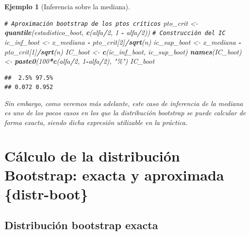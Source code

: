 \documentclass[
]{book}
\newenvironment{Shaded}{\begin{snugshade}}{\end{snugshade}}
\newcommand{\CommentTok}[1]{\textcolor[rgb]{0.56,0.35,0.01}{\textit{#1}}}
\newcommand{\DecValTok}[1]{\textcolor[rgb]{0.00,0.00,0.81}{#1}}
\newcommand{\FunctionTok}[1]{\textcolor[rgb]{0.13,0.29,0.53}{\textbf{#1}}}
\newcommand{\NormalTok}[1]{#1}
\newcommand{\OtherTok}[1]{\textcolor[rgb]{0.56,0.35,0.01}{#1}}
\newcommand{\SpecialCharTok}[1]{\textcolor[rgb]{0.81,0.36,0.00}{\textbf{#1}}}
\newcommand{\StringTok}[1]{\textcolor[rgb]{0.31,0.60,0.02}{#1}}
\theoremstyle{break}
\newtheorem{example}{Ejemplo}[chapter]
\theoremstyle{nonumberplain}
\renewcommand{\CommentTok}[1]{\textcolor[rgb]{0.41,0.41,0.41}{\texttt{#1}}}
\begin{document}
\begin{example}[Inferencia sobre la mediana]
\begin{Shaded}
\begin{Highlighting}[]
\CommentTok{\# Aproximación bootstrap de los ptos críticos}
\NormalTok{pto\_crit }\OtherTok{\textless{}{-}} \FunctionTok{quantile}\NormalTok{(estadistico\_boot, }\FunctionTok{c}\NormalTok{(alfa}\SpecialCharTok{/}\DecValTok{2}\NormalTok{, }\DecValTok{1} \SpecialCharTok{{-}}\NormalTok{ alfa}\SpecialCharTok{/}\DecValTok{2}\NormalTok{))}
\CommentTok{\# Construcción del IC}
\NormalTok{ic\_inf\_boot }\OtherTok{\textless{}{-}}\NormalTok{ x\_mediana }\SpecialCharTok{{-}}\NormalTok{ pto\_crit[}\DecValTok{2}\NormalTok{]}\SpecialCharTok{/}\FunctionTok{sqrt}\NormalTok{(n)}
\NormalTok{ic\_sup\_boot }\OtherTok{\textless{}{-}}\NormalTok{ x\_mediana }\SpecialCharTok{{-}}\NormalTok{ pto\_crit[}\DecValTok{1}\NormalTok{]}\SpecialCharTok{/}\FunctionTok{sqrt}\NormalTok{(n)}
\NormalTok{IC\_boot }\OtherTok{\textless{}{-}} \FunctionTok{c}\NormalTok{(ic\_inf\_boot, ic\_sup\_boot)}
\FunctionTok{names}\NormalTok{(IC\_boot) }\OtherTok{\textless{}{-}} \FunctionTok{paste0}\NormalTok{(}\DecValTok{100}\SpecialCharTok{*}\FunctionTok{c}\NormalTok{(alfa}\SpecialCharTok{/}\DecValTok{2}\NormalTok{, }\DecValTok{1}\SpecialCharTok{{-}}\NormalTok{alfa}\SpecialCharTok{/}\DecValTok{2}\NormalTok{), }\StringTok{"\%"}\NormalTok{)}
\NormalTok{IC\_boot}
\end{Highlighting}
\end{Shaded}

\begin{verbatim}
##  2.5% 97.5% 
## 0.072 0.952
\end{verbatim}

Sin embargo, como veremos más adelante, este caso de inferencia de la
mediana es uno de los pocos casos en los que la distribución bootstrap
se puede calcular de forma exacta, siendo dicha expresión utilizable en
la práctica.
\end{example}

\section{Cálculo de la distribución Bootstrap: exacta y aproximada \{distr-boot\}}\label{cuxe1lculo-de-la-distribuciuxf3n-bootstrap-exacta-y-aproximada-distr-boot}

\subsection{Distribución bootstrap exacta}\label{distribuciuxf3n-bootstrap-exacta}
\end{document}
